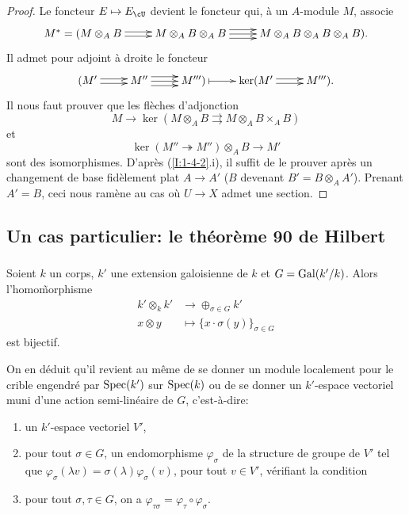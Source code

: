 \begin{proof}
Le foncteur $E\mapsto E_\cU$ devient le foncteur qui, à un $A$-module $M$, 
associe 
\[\xymatrix{
  M^* = (M\otimes_A B \ar@<2pt>[r] \ar@<-2pt>[r] 
    & M\otimes_A B\otimes_A B \ar@<-4pt>[r] \ar[r] \ar@<4pt>[r] 
    & M\otimes_A B\otimes_A B\otimes_A B)\text{.}
}\]
Il admet pour adjoint à droite le foncteur
\[\xymatrix{
  (M' \ar@<2pt>[r] \ar@<-2pt>[r] 
    & M'' \ar@<-4pt>[r] \ar[r] \ar@<4pt>[r]
    & M''') \ar@{|->}[r] 
    & \ker(M' \ar@<2pt>[r] \ar@<-2pt>[r] 
    & M''')\text{.}
}\]
Il nous faut prouver que les flèches d'adjonction 
\[
  M \to\ker(M\otimes_A B\rightrightarrows M\otimes_A B\times_A B)
\]
et
\[
  \ker(M''\twoheadrightarrow M'')\otimes_A B \to M'
\]
sont des isomorphismes. D'après (\ref{I:1-4-2}.i), il suffit de le prouver 
après un changement de base fidèlement plat $A\to A'$ ($B$ devenant 
$B'=B\otimes_A A'$). Prenant $A'=B$, ceci nous ramène au cas où $U\to X$ 
admet une section. 
\end{proof}










\subsection{Un cas particulier: le théorème 90 de Hilbert}\label{I:1-5}





\subsubsection{}\label{I:1-5-1}

Soient $k$ un corps, $k'$ une extension galoisienne de $k$ et $G=\operatorname{Gal}(k'/k)$. 
Alors l'homo\~morphisme 
\begin{align*}
  k'\otimes_k k' &\to \oplus_{\sigma\in G} k' \\
  x\otimes y     &\mapsto \{x\cdot \sigma(y)\}_{\sigma\in G}
\end{align*}
est bijectif. 

On en déduit qu'il revient au même de se donner un module localement pour 
le crible engendré par $\operatorname{Spec}(k')$ sur $\operatorname{Spec}(k)$ ou de se donner un 
$k'$-espace vectoriel muni d'une action semi-linéaire de $G$, c'est-à-dire: 
\begin{enumerate}[\indent a)]
  \item un $k'$-espace vectoriel $V'$,
  \item pour tout $\sigma\in G$, un endomorphisme $\varphi_\sigma$ de la 
    structure de groupe de $V'$ tel que 
    $\varphi_\sigma(\lambda v) = \sigma(\lambda) \varphi_\sigma(v)$, pour 
    tout $v\in V'$, vérifiant la condition 
  \item pour tout $\sigma,\tau\in G$, on a 
    $\varphi_{\tau\sigma} = \varphi_\tau\circ\varphi_\sigma$. 
\end{enumerate}

